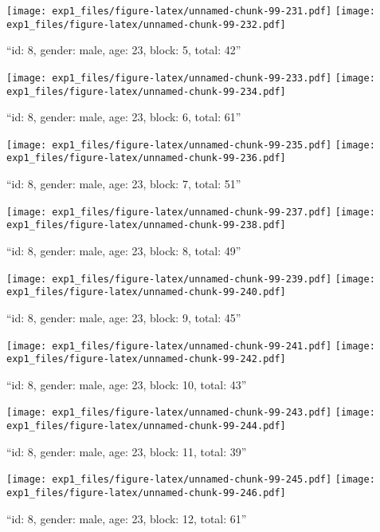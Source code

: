 \documentclass[,]{article}
\begin{document}
\texttt{[image: exp1\_files/figure-latex/unnamed-chunk-99-231.pdf]}
\texttt{[image: exp1\_files/figure-latex/unnamed-chunk-99-232.pdf]}

\newpage
[1] 

``id: 8, gender: male, age: 23, block: 5, total: 42''

\texttt{[image: exp1\_files/figure-latex/unnamed-chunk-99-233.pdf]}
\texttt{[image: exp1\_files/figure-latex/unnamed-chunk-99-234.pdf]}

\newpage
[1] 

``id: 8, gender: male, age: 23, block: 6, total: 61''

\texttt{[image: exp1\_files/figure-latex/unnamed-chunk-99-235.pdf]}
\texttt{[image: exp1\_files/figure-latex/unnamed-chunk-99-236.pdf]}

\newpage
[1] 

``id: 8, gender: male, age: 23, block: 7, total: 51''

\texttt{[image: exp1\_files/figure-latex/unnamed-chunk-99-237.pdf]}
\texttt{[image: exp1\_files/figure-latex/unnamed-chunk-99-238.pdf]}

\newpage
[1] 

``id: 8, gender: male, age: 23, block: 8, total: 49''

\texttt{[image: exp1\_files/figure-latex/unnamed-chunk-99-239.pdf]}
\texttt{[image: exp1\_files/figure-latex/unnamed-chunk-99-240.pdf]}

\newpage
[1] 

``id: 8, gender: male, age: 23, block: 9, total: 45''

\texttt{[image: exp1\_files/figure-latex/unnamed-chunk-99-241.pdf]}
\texttt{[image: exp1\_files/figure-latex/unnamed-chunk-99-242.pdf]}

\newpage
[1] 

``id: 8, gender: male, age: 23, block: 10, total: 43''

\texttt{[image: exp1\_files/figure-latex/unnamed-chunk-99-243.pdf]}
\texttt{[image: exp1\_files/figure-latex/unnamed-chunk-99-244.pdf]}

\newpage
[1] 

``id: 8, gender: male, age: 23, block: 11, total: 39''

\texttt{[image: exp1\_files/figure-latex/unnamed-chunk-99-245.pdf]}
\texttt{[image: exp1\_files/figure-latex/unnamed-chunk-99-246.pdf]}

\newpage
[1] 

``id: 8, gender: male, age: 23, block: 12, total: 61''
\end{document}
